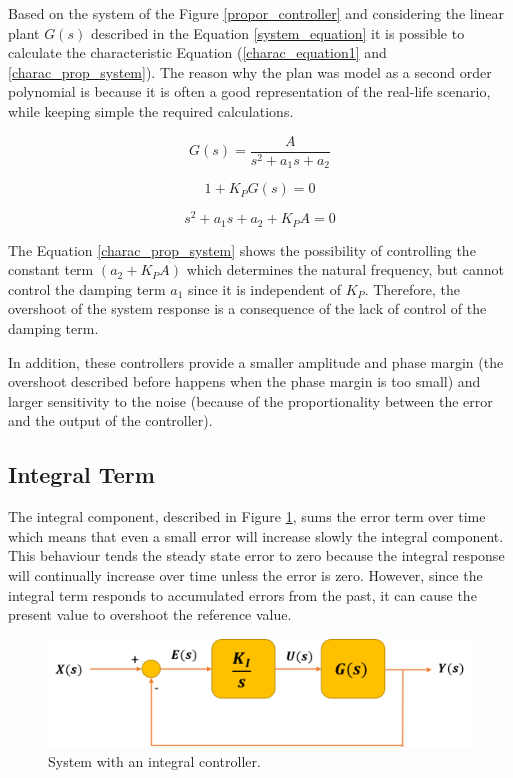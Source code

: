 Based on the system of the Figure \ref{propor_controller} and considering the linear plant $G(s)$ described in the Equation \ref{system_equation} it is possible to calculate the characteristic Equation (\ref{charac_equation1} and \ref{charac_prop_system}). The reason why the plan was model as a second order polynomial is because it is often a good representation of the real-life scenario, while keeping simple the required calculations.

\begin{equation}\label{system_equation}
G(s)= \frac{A}{s^2 + a_{1}s + a_{2}}
\end{equation}

\begin{equation}\label{charac_equation1}
1 + K_PG(s)=0
\end{equation}

\begin{equation}\label{charac_prop_system}
s^2 + a_{1}s + a_{2} + K_PA=0
\end{equation}

The Equation \ref{charac_prop_system} shows the possibility of controlling the constant term $(a_{2} + K_PA)$ which determines the natural frequency, but cannot control the damping term $a_{1}$ since it is independent of $K_{P}$. Therefore, the overshoot of the system response is a consequence of the lack of control of the damping term.

In addition, these controllers provide a smaller amplitude and phase margin (the overshoot described before happens when the phase margin is too small) and larger sensitivity to the noise (because of the proportionality between the error and the output of the controller).

\subsection*{Integral Term}

The integral component, described in Figure \ref{integ_controller}, sums the error term over time which means that even a small error will increase slowly the integral component. This behaviour tends the steady state error to zero because the integral response will continually increase over time unless the error is zero. However, since the integral term responds to accumulated errors from the past, it can cause the present value to overshoot the reference value.

\begin{figure}[H]
	\centering
	\includegraphics[scale=0.6]{figures/integ_controller.png}
	\caption{System with an integral controller.}
	\label{integ_controller}
\end{figure}

